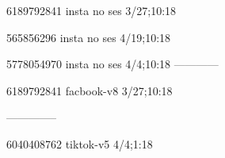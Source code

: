 6189792841 insta no ses
3/27;10:18

565856296 insta no ses
4/19;10:18

5778054970 insta no ses
4/4;10:18
------------

6189792841 facbook-v8
3/27;10:18


--------------

6040408762 tiktok-v5
4/4;1:18
